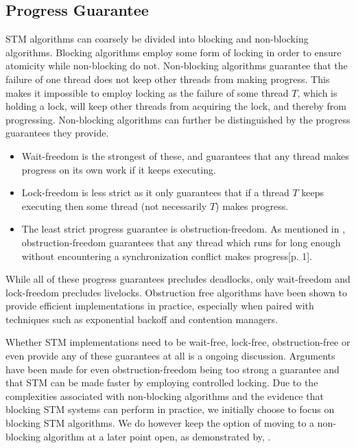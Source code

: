 \subsection{Progress Guarantee}
\ac{STM} algorithms can coarsely be divided into blocking and non-blocking algorithms\cite[p. 47]{harris2010transactional}. Blocking algorithms employ some form of locking in order to ensure atomicity while non-blocking do not\cite[p. 59]{herlihy2012art}. Non-blocking algorithms guarantee that the failure of one thread does not keep other threads from making progress\cite[p. 47]{harris2010transactional}\cite[p. 142]{herlihy1991wait}\cite[p. 59]{herlihy2012art}. This  makes it impossible to employ locking as the failure of some thread $T$, which is holding a lock, will keep other threads from acquiring the lock, and thereby from progressing. Non-blocking algorithms can further be distinguished by the progress guarantees they provide. 
\begin{itemize}
	\item Wait-freedom is the strongest of these, and guarantees that any thread makes progress on its own work if it keeps executing\cite[p. 124]{herlihy1991wait}\cite[p. 59]{herlihy2012art}. 
	\item Lock-freedom is less strict as it only guarantees that if a thread $T$ keeps executing then some thread (not necessarily $T$) makes progress\cite[p. 47]{harris2010transactional}\cite[p. 60]{herlihy2012art}. 
	\item The least strict progress guarantee is obstruction-freedom\cite[p. 47]{harris2010transactional}\cite{herlihy2003obstruction}\cite[p. 61]{herlihy2012art}. As mentioned in , obstruction-freedom guarantees that any thread which runs for long enough without encountering a synchronization conflict makes progress\cite{herlihy2003obstruction}[p. 1]. 
\end{itemize}

While all of these progress guarantees precludes deadlocks, only wait-freedom and lock-freedom precludes livelocks\cite[p. 47]{harris2010transactional}. Obstruction free algorithms have been shown to provide efficient implementations in practice\cite[p. 61]{herlihy2012art}, especially when paired with techniques such as exponential backoff\cite[p. 147]{herlihy2012art} and contention managers\cite[p. 51]{harris2010transactional}.

Whether \ac{STM} implementations need to be wait-free, lock-free, obstruction-free or even provide any of these guarantees at all is a ongoing discussion. Arguments have been made for even obstruction-freedom being too strong a guarantee and that \ac{STM} can be made faster by employing controlled locking\cite{ennals2006software}. Due to the complexities associated with non-blocking algorithms\cite{al2013nonblocking} and the evidence that blocking \ac{STM} systems can perform in practice, we initially choose to focus on blocking \ac{STM} algorithms. We do however keep the option of moving to a non-blocking algorithm at a later point open, as demonstrated by,  \cite{fernandes2011lock}.


